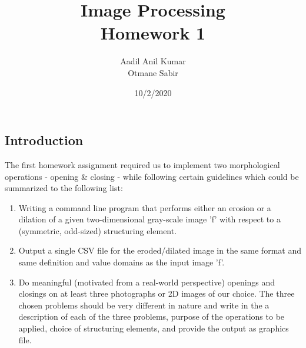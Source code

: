 \documentclass{article}
\begin{document}
\title{Image Processing \\
Homework 1}
\author{Aadil Anil Kumar \\
Otmane Sabir
}
\date{10/2/2020}
\maketitle
\vspace{10mm}
\begin{center}
\section*{Introduction}
\large
The first homework assignment required us to implement two morphological operations - opening \& closing - while following certain guidelines which could be summarized to the following list: 
\vspace{7mm}
\begin{enumerate}
    \item Writing a command line program that performs either an erosion or a dilation of a given two-dimensional gray-scale image 'f' with respect to a (symmetric, odd-sized) structuring element.
    \item Output a single CSV file for the eroded/dilated image in the same format and same definition and value domains as the input image 'f'.
    \item Do meaningful (motivated from a real-world perspective) openings and closings on at least three photographs or 2D images of our choice. The three chosen problems should be very different in nature and write in the a description of each of the three problems, purpose of the operations to be applied, choice of structuring elements, and provide the output as graphics file.
\end{enumerate}
\end{center}
\newpage

\tableofcontents

\newpage
\end{document}
